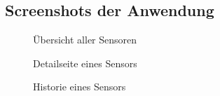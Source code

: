 \subsection{Screenshots der Anwendung}
\label{app:Screenshots}
\begin{figure}[htb]
\centering
{}
\caption{Übersicht aller Sensoren}
\end{figure}

\begin{figure}[htb]
\centering
{}
\caption{Detailseite eines Sensors}
\end{figure}

\begin{figure}[htb]
\centering
{}
\caption{Historie eines Sensors}
\end{figure}
